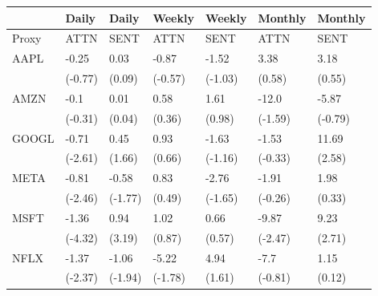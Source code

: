 \begin{tabular}{lllllll}
\toprule
{} &    Daily &    Daily &   Weekly &   Weekly &  Monthly &  Monthly \\
\midrule
Proxy &     ATTN &     SENT &     ATTN &     SENT &     ATTN &     SENT \\
AAPL  &    -0.25 &     0.03 &    -0.87 &    -1.52 &     3.38 &     3.18 \\
      &  (-0.77) &   (0.09) &  (-0.57) &  (-1.03) &   (0.58) &   (0.55) \\
AMZN  &     -0.1 &     0.01 &     0.58 &     1.61 &    -12.0 &    -5.87 \\
      &  (-0.31) &   (0.04) &   (0.36) &   (0.98) &  (-1.59) &  (-0.79) \\
GOOGL &    -0.71 &     0.45 &     0.93 &    -1.63 &    -1.53 &    11.69 \\
      &  (-2.61) &   (1.66) &   (0.66) &  (-1.16) &  (-0.33) &   (2.58) \\
META  &    -0.81 &    -0.58 &     0.83 &    -2.76 &    -1.91 &     1.98 \\
      &  (-2.46) &  (-1.77) &   (0.49) &  (-1.65) &  (-0.26) &   (0.33) \\
MSFT  &    -1.36 &     0.94 &     1.02 &     0.66 &    -9.87 &     9.23 \\
      &  (-4.32) &   (3.19) &   (0.87) &   (0.57) &  (-2.47) &   (2.71) \\
NFLX  &    -1.37 &    -1.06 &    -5.22 &     4.94 &     -7.7 &     1.15 \\
      &  (-2.37) &  (-1.94) &  (-1.78) &   (1.61) &  (-0.81) &   (0.12) \\
\bottomrule
\end{tabular}
